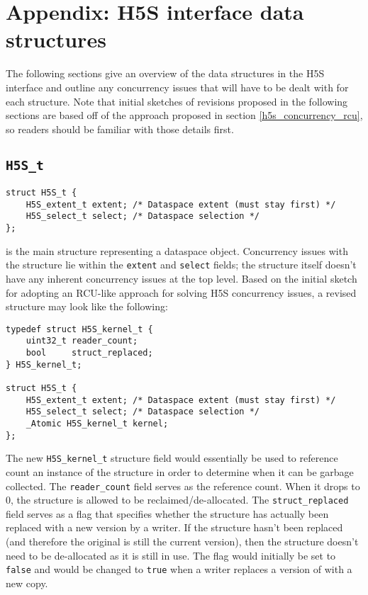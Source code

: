 \documentclass[../HDF5_RFC.tex]{subfiles}
\begin{document}
\newpage

\section{Appendix: H5S interface data structures}
\label{apdx:h5s_data_structures}

The following sections give an overview of the data structures in the H5S interface
and outline any concurrency issues that will have to be dealt with for each structure.
Note that initial sketches of revisions proposed in the following sections are based
off of the approach proposed in section \ref{h5s_concurrency_rcu}, so readers should
be familiar with those details first.

\subsection{\texttt{H5S\_t}}
\label{apdx:h5s_struct_h5s_t}

\begin{verbatim}
struct H5S_t {
    H5S_extent_t extent; /* Dataspace extent (must stay first) */
    H5S_select_t select; /* Dataspace selection */
};
\end{verbatim}

 is the main structure representing a dataspace object.
Concurrency issues with the structure lie within the \texttt{extent} and \texttt{select}
fields; the structure itself doesn't have any inherent concurrency issues at the top
level. Based on the initial sketch for adopting an RCU-like approach for solving H5S
concurrency issues, a revised  structure may look like
the following:

\begin{verbatim}
typedef struct H5S_kernel_t {
    uint32_t reader_count;
    bool     struct_replaced;
} H5S_kernel_t;

struct H5S_t {
    H5S_extent_t extent; /* Dataspace extent (must stay first) */
    H5S_select_t select; /* Dataspace selection */
    _Atomic H5S_kernel_t kernel;
};
\end{verbatim}

The new \texttt{H5S\_kernel\_t} structure field would essentially be used to reference count
an instance of the structure in order to determine when it can be garbage collected. The
\texttt{reader\_count} field serves as the reference count. When it drops to 0, the structure
is allowed to be reclaimed/de-allocated. The \texttt{struct\_replaced} field serves as a flag
that specifies whether the structure has actually been replaced with a new version by a writer.
If the structure hasn't been replaced (and therefore the original is still the current version),
then the structure doesn't need to be de-allocated as it is still in use. The flag would
initially be set to \texttt{false} and would be changed to \texttt{true} when a writer replaces
a version of  with a new copy.
\end{document}
